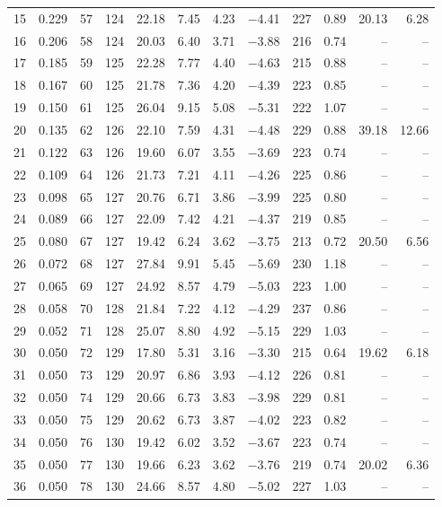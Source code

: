\begin{table}[H]
\begin{tabular}{rrrrrrrrrrrr}
15 & 0.229 & 57 & 124 & 22.18 & 7.45 & 4.23 & $-$4.41 & 227 & 0.89 & 20.13 & 6.28 \\
16 & 0.206 & 58 & 124 & 20.03 & 6.40 & 3.71 & $-$3.88 & 216 & 0.74 & -- & -- \\
17 & 0.185 & 59 & 125 & 22.28 & 7.77 & 4.40 & $-$4.63 & 215 & 0.88 & -- & -- \\
18 & 0.167 & 60 & 125 & 21.78 & 7.36 & 4.20 & $-$4.39 & 223 & 0.85 & -- & -- \\
19 & 0.150 & 61 & 125 & 26.04 & 9.15 & 5.08 & $-$5.31 & 222 & 1.07 & -- & -- \\
20 & 0.135 & 62 & 126 & 22.10 & 7.59 & 4.31 & $-$4.48 & 229 & 0.88 & 39.18 & 12.66 \\
21 & 0.122 & 63 & 126 & 19.60 & 6.07 & 3.55 & $-$3.69 & 223 & 0.74 & -- & -- \\
22 & 0.109 & 64 & 126 & 21.73 & 7.21 & 4.11 & $-$4.26 & 225 & 0.86 & -- & -- \\
23 & 0.098 & 65 & 127 & 20.76 & 6.71 & 3.86 & $-$3.99 & 225 & 0.80 & -- & -- \\
24 & 0.089 & 66 & 127 & 22.09 & 7.42 & 4.21 & $-$4.37 & 219 & 0.85 & -- & -- \\
25 & 0.080 & 67 & 127 & 19.42 & 6.24 & 3.62 & $-$3.75 & 213 & 0.72 & 20.50 & 6.56 \\
26 & 0.072 & 68 & 127 & 27.84 & 9.91 & 5.45 & $-$5.69 & 230 & 1.18 & -- & -- \\
27 & 0.065 & 69 & 127 & 24.92 & 8.57 & 4.79 & $-$5.03 & 223 & 1.00 & -- & -- \\
28 & 0.058 & 70 & 128 & 21.84 & 7.22 & 4.12 & $-$4.29 & 237 & 0.86 & -- & -- \\
29 & 0.052 & 71 & 128 & 25.07 & 8.80 & 4.92 & $-$5.15 & 229 & 1.03 & -- & -- \\
30 & 0.050 & 72 & 129 & 17.80 & 5.31 & 3.16 & $-$3.30 & 215 & 0.64 & 19.62 & 6.18 \\
31 & 0.050 & 73 & 129 & 20.97 & 6.86 & 3.93 & $-$4.12 & 226 & 0.81 & -- & -- \\
32 & 0.050 & 74 & 129 & 20.66 & 6.73 & 3.83 & $-$3.98 & 229 & 0.81 & -- & -- \\
33 & 0.050 & 75 & 129 & 20.62 & 6.73 & 3.87 & $-$4.02 & 223 & 0.82 & -- & -- \\
34 & 0.050 & 76 & 130 & 19.42 & 6.02 & 3.52 & $-$3.67 & 223 & 0.74 & -- & -- \\
35 & 0.050 & 77 & 130 & 19.66 & 6.23 & 3.62 & $-$3.76 & 219 & 0.74 & 20.02 & 6.36 \\
36 & 0.050 & 78 & 130 & 24.66 & 8.57 & 4.80 & $-$5.02 & 227 & 1.03 & -- & -- \\

\end{tabular}
\end{table}
